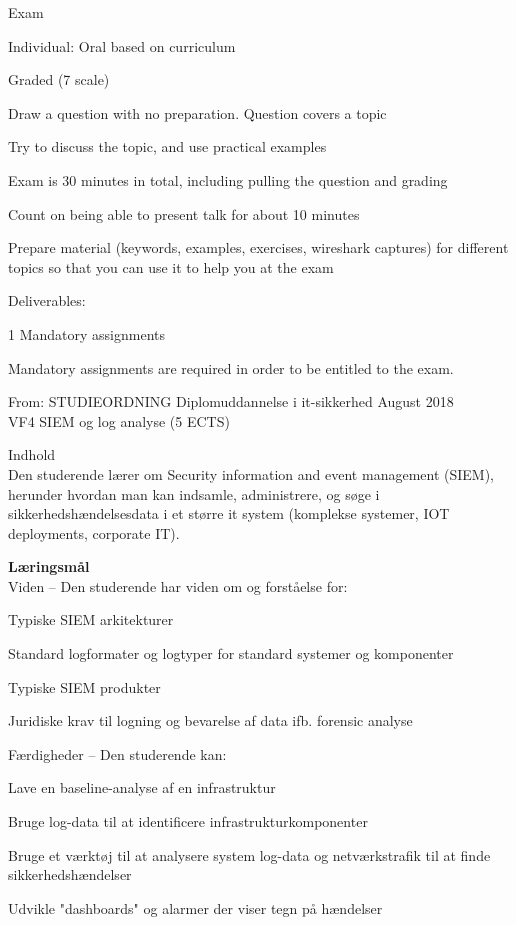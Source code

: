 \documentclass[Screen16to9,17pt]{foils}
\begin{document}
\begin{list2}
\item Exam
\item Individual: Oral based on curriculum
\item Graded (7 scale)
\item Draw a question with no preparation. Question covers a topic
\item Try to discuss the topic, and use practical examples
\item Exam is 30 minutes in total, including pulling the question and grading
\item Count on being able to present talk for about 10 minutes
\item Prepare material (keywords, examples, exercises, wireshark captures) for different topics so that you can use it to help you at the exam

\vskip 5mm
\item Deliverables:
\item 1 Mandatory assignments
\item Mandatory assignments are required in order to be entitled to the exam.
\end{list2}





From: STUDIEORDNING Diplomuddannelse i it-sikkerhed August 2018\\
VF4 SIEM og log analyse (5 ECTS)

Indhold\\
Den studerende lærer om Security information and event management (SIEM), herunder
hvordan man kan indsamle, administrere, og søge i sikkerhedshændelsesdata i et større it
system (komplekse systemer, IOT deployments, corporate IT).

{\bf Læringsmål}\\
Viden -- Den studerende har viden om og forståelse for:
\begin{list2}
\item Typiske SIEM arkitekturer
\item Standard logformater og logtyper for standard systemer og komponenter
\item Typiske SIEM produkter
\item Juridiske krav til logning og bevarelse af data ifb. forensic analyse
\end{list2}

Færdigheder -- Den studerende kan:
\begin{list2}
\item Lave en baseline-analyse af en infrastruktur
\item Bruge log-data til at identificere infrastrukturkomponenter
\item Bruge et værktøj til at analysere system log-data og netværkstrafik til at finde sikkerhedshændelser
\item Udvikle "dashboards" og alarmer der viser tegn på hændelser
\end{list2}
\end{document}
